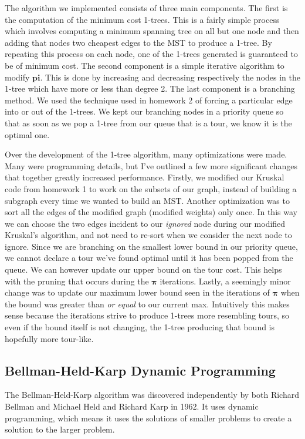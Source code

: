 \documentclass[11pt]{article}
\newcommand{\ve}[1]{\boldsymbol{#1}}
\begin{document}
The algorithm we implemented consists of three main components. The first is the computation of the minimum cost 1-trees. This is a fairly simple process which involves computing a minimum spanning tree on all but one node and then adding that nodes two cheapest edges to the MST to produce a 1-tree. By repeating this process on each node, one of the 1-trees generated is guaranteed to be of minimum cost. The second component is a simple iterative algorithm to modify $\ve{pi}$. This is done by increasing and decreasing respectively the nodes in the 1-tree which have more or less than degree 2. The last component is a branching method. We used the technique used in homework 2 of forcing a particular edge into or out of the 1-trees. We kept our branching nodes in a priority queue so that as soon as we pop a 1-tree from our queue that is a tour, we know it is the optimal one.

Over the development of the 1-tree algorithm, many optimizations were made. Many were programming details, but I've outlined a few more significant changes that together greatly increased performance. Firstly, we modified our Kruskal code from homework 1 to work on the subsets of our graph, instead of building a subgraph every time we wanted to build an MST. Another optimization was to sort all the edges of the modified graph (modified weights) only once. In this way we can choose the two edges incident to our \emph{ignored} node during our modified Kruskal's algorithm, and not need to re-sort when we consider the next node to ignore. Since we are branching on the smallest lower bound in our priority queue, we cannot declare a tour we've found optimal until it has been popped from the queue. We can however update our upper bound on the tour cost. This helps with the pruning that occurs during the $\ve{\pi}$ iterations. Lastly, a seemingly minor change was to update our maximum lower bound seen in the iterations of $\ve{\pi}$ when the bound was greater than \emph{or equal} to our current max. Intuitively this makes sense because the iterations strive to produce 1-trees more resembling tours, so even if the bound itself is not changing, the 1-tree producing that bound is hopefully more tour-like.

\subsection{Bellman-Held-Karp Dynamic Programming}

The Bellman-Held-Karp algorithm was discovered independently by both Richard Bellman \cite{Bellman} and Michael Held and Richard Karp \cite{HeldKarp} in 1962. It uses dynamic programming, which means it uses the solutions of smaller problems to create a solution to the larger problem.
\end{document}
